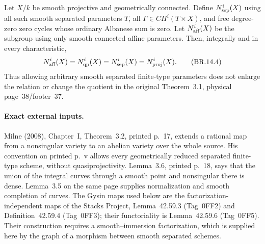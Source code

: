 Let \(X/k\) be smooth projective and geometrically connected.
Define \(N^i_{\rm sep}(X)\) using all such smooth separated
parameters \(T\), all \(\Gamma\in CH^i(T\times X)\), and free
degree-zero zero cycles whose ordinary Albanese sum is zero.
Let \(N^i_{\rm aff}(X)\) be the subgroup using only smooth
connected affine parameters.  Then, integrally and in every
characteristic,
\[
 N^i_{\rm aff}(X)=N^i_{\rm qp}(X)
                =N^i_{\rm sep}(X)=N^i_{\rm proj}(X).           \tag{BR.14.4}
\]
Thus allowing arbitrary smooth separated finite-type parameters
does not enlarge the relation or change the quotient in the
original Theorem~3.1, physical page~38/footer~37.

\paragraph{Exact external inputs.}
Milne (2008), Chapter~I, Theorem~3.2, printed p.~17, extends a
rational map from a nonsingular variety to an abelian variety over
the whole source.  His convention on printed p.~v allows every
geometrically reduced separated finite-type scheme, without
quasiprojectivity.  Lemma~3.6, printed p.~18, says that the union
of the integral curves through a smooth point and nonsingular
there is dense.  Lemma~3.5 on the same page supplies normalization
and smooth completion of curves.  The Gysin maps used below are
the factorization-independent maps of the Stacks Project,
Lemma~42.59.3 (Tag~0FF2) and Definition~42.59.4 (Tag~0FF3);
their functoriality is Lemma~42.59.6 (Tag~0FF5).  Their construction
requires a smooth--immersion factorization, which is supplied
here by the graph of a morphism between smooth separated schemes.


